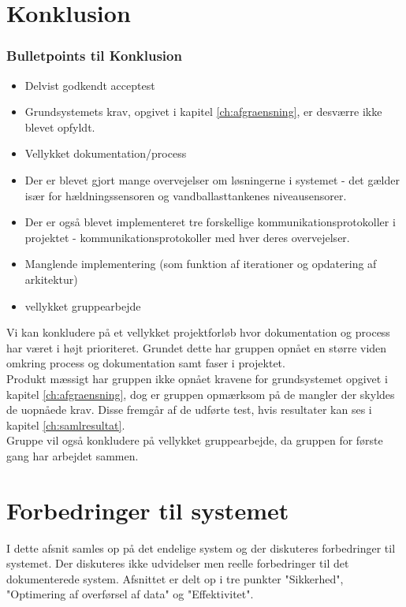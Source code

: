 \chapter{Konklusion}
\subsection{Bulletpoints til Konklusion}
\begin{itemize}
\item Delvist godkendt acceptest
\item Grundsystemets krav, opgivet i kapitel \ref{ch:afgraensning}, er desværre ikke blevet opfyldt.
\item Vellykket dokumentation/process
\item Der er blevet gjort mange overvejelser om løsningerne i systemet - det gælder især for hældningssensoren og vandballasttankenes niveausensorer.
\item Der er også blevet implementeret tre forskellige kommunikationsprotokoller i projektet - kommunikationsprotokoller med hver deres overvejelser.  
\item Manglende implementering (som funktion af iterationer og opdatering af arkitektur)
\item vellykket gruppearbejde
\end{itemize}

Vi kan konkludere på et vellykket projektforløb hvor dokumentation og process har været i højt prioriteret. Grundet dette har gruppen opnået en større viden omkring process og dokumentation samt faser i projektet. \\
Produkt mæssigt har gruppen ikke opnået kravene for grundsystemet opgivet i kapitel \ref{ch:afgraensning}, dog er gruppen opmærksom på de mangler der skyldes de uopnåede krav. Disse fremgår af de udførte test, hvis resultater kan ses i kapitel \ref{ch:samlresultat}.\\
Gruppe vil også konkludere på vellykket gruppearbejde, da gruppen for første gang har arbejdet sammen.\\ 



\chapter{Forbedringer til systemet}

I dette afsnit samles op på det endelige system og der diskuteres forbedringer til systemet. Der diskuteres ikke udvidelser men reelle forbedringer til det dokumenterede system. Afsnittet er delt op i tre punkter "Sikkerhed", "Optimering af overførsel af data" og "Effektivitet". 

